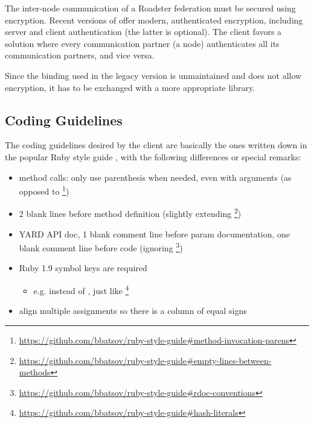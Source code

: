 The inter-node communication of a Roadster federation must be secured using
encryption. Recent versions of \zmq offer modern, authenticated encryption,
including server and client authentication (the latter is optional).
The client favors a solution where every communication partner (a node)
authenticates all its communication partners, and vice versa.

Since the \zmq binding used in the legacy version is unmaintained and does not
allow encryption, it has to be exchanged with a more appropriate library.

\subsection{Coding Guidelines}
The coding guidelines desired by the client are basically the ones written down
in the popular Ruby style guide \cite{rb:style-guide}, with the following
differences or special remarks:

\begin{itemize}
	\item method calls: only use parenthesis when needed, even with
		arguments (as opposed to
		\footnote{\url{https://github.com/bbatsov/ruby-style-guide\#method-invocation-parens}})
	\item 2 blank lines before method definition (slightly extending
		\footnote{\url{https://github.com/bbatsov/ruby-style-guide\#empty-lines-between-methods}})
	\item YARD API doc, 1 blank comment line before param documentation,
		one blank comment line before code (ignoring
		\footnote{\url{https://github.com/bbatsov/ruby-style-guide\#rdoc-conventions}})
	\item Ruby 1.9 symbol keys are required
		\begin{itemize}
			\item e.g.  instead of , just like
			\footnote{\url{https://github.com/bbatsov/ruby-style-guide\#hash-literals}}
		\end{itemize}
	\item align multiple assignments so there is a column of equal signs
\end{itemize}
